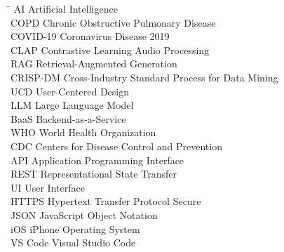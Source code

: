 
\begin{tabbing}

\hspace{2cm} \= \kill
AI \> Artificial Intelligence \\
COPD \> Chronic Obstructive Pulmonary Disease \\
COVID-19 \> Coronavirus Disease 2019 \\
CLAP \> Contrastive Learning Audio Processing \\
RAG \> Retrieval-Augmented Generation \\
CRISP-DM \> Cross-Industry Standard Process for Data Mining \\
UCD \> User-Centered Design \\
LLM \> Large Language Model \\
BaaS \> Backend-as-a-Service \\
WHO \> World Health Organization \\
CDC \> Centers for Disease Control and Prevention \\
API \> Application Programming Interface \\
REST \> Representational State Transfer \\
UI \> User Interface \\
HTTPS \> Hypertext Transfer Protocol Secure \\
JSON \> JavaScript Object Notation \\
iOS \> iPhone Operating System \\
VS Code \> Visual Studio Code \\

\end{tabbing}
